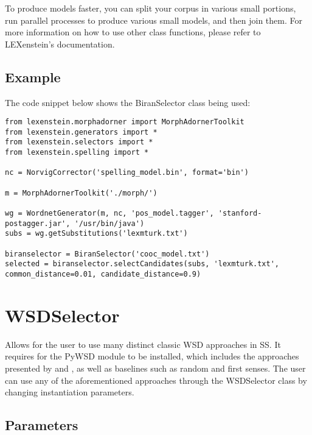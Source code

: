 To produce models faster, you can split your corpus in various small portions, run parallel processes to produce various small models, and then join them.  For more information on how to use other class functions, please refer to LEXenstein's documentation.

\subsection{Example}

The code snippet below shows the BiranSelector class being used:

\begin{lstlisting}
from lexenstein.morphadorner import MorphAdornerToolkit
from lexenstein.generators import *
from lexenstein.selectors import *
from lexenstein.spelling import *

nc = NorvigCorrector('spelling_model.bin', format='bin')

m = MorphAdornerToolkit('./morph/')

wg = WordnetGenerator(m, nc, 'pos_model.tagger', 'stanford-postagger.jar', '/usr/bin/java')
subs = wg.getSubstitutions('lexmturk.txt')

biranselector = BiranSelector('cooc_model.txt')
selected = biranselector.selectCandidates(subs, 'lexmturk.txt', common_distance=0.01, candidate_distance=0.9)
\end{lstlisting}














\section{WSDSelector}

Allows for the user to use many distinct classic WSD approaches in SS. It requires for the PyWSD \cite{pywsd} module to be installed, which includes the approaches presented by \cite{lesk} and \cite{wupalmer}, as well as baselines such as random and first senses. The user can use any of the aforementioned approaches through the WSDSelector class by changing instantiation parameters.

\subsection{Parameters}

